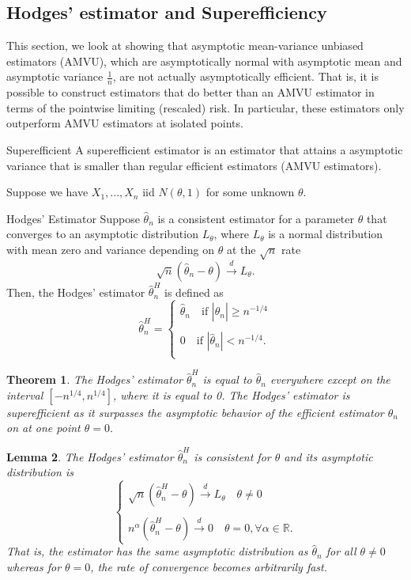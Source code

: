 \documentclass[twoside]{article}
\newcounter{lecnum}
\newtheorem{theorem}{Theorem}[lecnum]
\newtheorem{lemma}[theorem]{Lemma}
\begin{document}
\subsection{Hodges' estimator and Superefficiency}
This section, we look at showing that asymptotic mean-variance unbiased estimators (AMVU), which are asymptotically normal with asymptotic mean and asymptotic variance $\frac{1}{n}$, are not actually asymptotically efficient. That is, it is possible to construct estimators that do better than an AMVU estimator in terms of the pointwise limiting (rescaled) risk. In particular, these estimators only outperform AMVU estimators at isolated points.

\begin{definition_exam}{Superefficient}{} A superefficient estimator is an estimator that attains a asymptotic variance that is smaller than regular efficient estimators (AMVU estimators).
\end{definition_exam}

Suppose we have $X_1,...,X_n$ iid $N(\theta,1)$ for some unknown $\theta.$ 

\begin{definition_exam}{Hodges’ Estimator}{} Suppose $\hat{\theta}_n$ is a consistent estimator for a parameter $\theta$ that converges to an asymptotic distribution $L_{\theta}$, where $L_{\theta}$ is a normal distribution with mean zero and variance depending on $\theta$ at the $\sqrt{n}$ rate 
$$
\sqrt{n}(\hat{\theta}_n - \theta) \xrightarrow{d}L_{\theta}.
$$
Then, the Hodges’ estimator $\hat{\theta}_n^{H}$ is defined as 
$$
\hat{\theta}_n^{H} =
\begin{cases}
\hat{\theta}_n \quad \text{if } |\hat{\theta}_n| \geq n^{-1/4}\\
\\
0 \quad \text{if } |\hat{\theta}_n| < n^{-1/4}.\\
\end{cases}
$$
\end{definition_exam}

\begin{theorem}The Hodges’ estimator $\hat{\theta}_n^{H}$ is equal to $\hat{\theta}_n$ everywhere except on the interval $[-n^{1/4}, n^{1/4}]$, where it is equal to 0. The Hodges' estimator is superefficient as it surpasses the asymptotic behavior of the efficient estimator $\hat{\theta}_n$ on at one point $\theta = 0.$
\end{theorem}

\begin{lemma}The Hodges’ estimator $\hat{\theta}_n^{H}$ is consistent for $\theta$ and its asymptotic distribution is 
$$
\begin{cases}
\sqrt{n}(\hat{\theta}_n^{H} - \theta) \xrightarrow{d} L_{\theta} \quad \theta \neq 0\\\\
n^{\alpha}(\hat{\theta}_n^{H} - \theta) \xrightarrow{d} 0 \quad \theta = 0, \forall \alpha \in \mathbb{R}.
\end{cases}
$$
That is, the estimator has the same asymptotic distribution as $\hat{\theta}_n$ for all $\theta \neq 0$ whereas for $\theta = 0$, the rate of convergence becomes arbitrarily fast.
\end{lemma}
\end{document}
